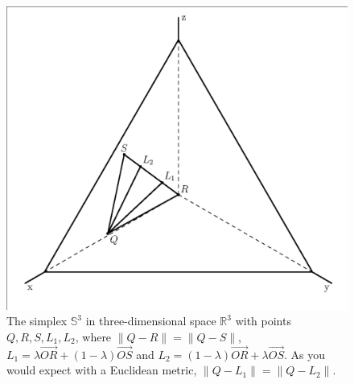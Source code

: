 \documentclass[11pt]{article}
\begin{document}
\begin{figure}[ht]
  \begin{flushright}
    \begin{minipage}[h]{.7\linewidth}
      \includegraphics[width=\textwidth]{symmetrylp.eps}
      \caption{\footnotesize The simplex $\mathbb{S}^{3}$ in
        three-dimensional space $\mathbb{R}^{3}$ with points
        $Q,R,S,L_{1},L_{2}$, where $\|Q-R\|=\|Q-S\|$,
        $L_{1}=\lambda\Vec{OR}+(1-\lambda)\Vec{OS}$ and
        $L_{2}=(1-\lambda)\Vec{OR}+\lambda\Vec{OS}$. As you would
        expect with a Euclidean metric, $\|Q-L_{1}\|=\|Q-L_{2}\|$.}
      \label{fig:symmetrylp}
    \end{minipage}
  \end{flushright}
\end{figure}
\end{document}
